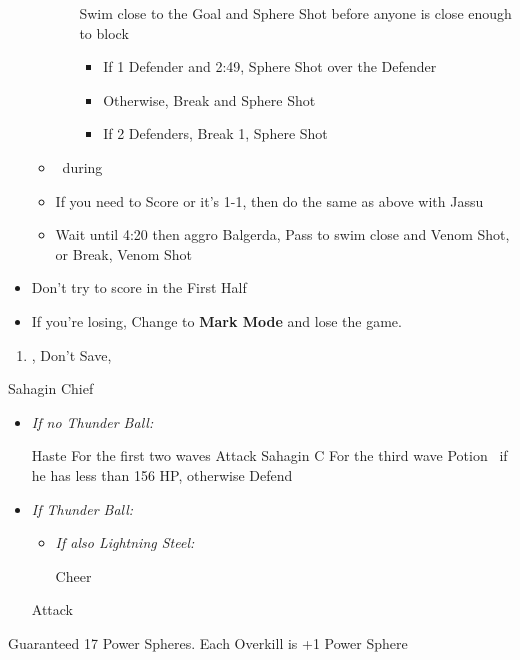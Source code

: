 \begin{blitzball}
\begin{itemize}
\begin{itemize}
\begin{itemize}
                \tidusf Swim close to the Goal and Sphere Shot before anyone is close enough to block
                \begin{itemize}
                    \item If 1 Defender and 2:49, Sphere Shot over the Defender
                    \item Otherwise, Break and Sphere Shot
                    \item If 2 Defenders, Break 1, Sphere Shot
                \end{itemize}
            \end{itemize}
            \item \sd\ during \wakka\ \cs
            \item If you need to Score or it's 1-1, then do the same as above with Jassu
            \item Wait until 4:20 then aggro Balgerda, Pass to \wakka
            \wakkaf swim close and Venom Shot, or Break, Venom Shot
        \end{itemize}
        \item Don't try to score in the First Half
        \item If you're losing, Change to \textbf{Mark Mode} and lose the game.
    \end{itemize}
\end{blitzball}
\begin{enumerate}[resume]
    \item \sd, Don't Save, \cs[1:00]
\end{enumerate}
\begin{battle}{Sahagin Chief}
    \begin{itemize}
        \item \textit{If no Thunder Ball:}
        \begin{itemize}
            \tidusf Haste \tidus
            \wakkaf For the first two waves Attack Sahagin C
            \wakkaf For the third wave Potion \tidus\ if he has less than 156 HP, otherwise Defend
        \end{itemize}
        \item \textit{If Thunder Ball:}
        \begin{itemize}
            \tidusf Cheer
            \wakkaf Attack
            \tidusf Haste \tidus
            \tidusf Haste \wakka
            \item \textit{If also Lightning Steel:}
            \begin{itemize}
                \tidusf Cheer
            \end{itemize}
        \end{itemize}
        \tidusf Attack
    \end{itemize}
    Guaranteed 17 Power Spheres. Each Overkill is +1 Power Sphere
\end{battle}
